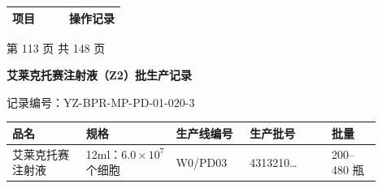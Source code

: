 \documentclass[UTF8,10pt,a4paper,fontset=fandol]{ctexart}
\newcommand{\fieldvalue}[1]{#1}
\newcommand{\handwritten}[1]{#1}
\begin{document}
\begin{tabular}{|p{0.5\linewidth}|p{0.5\linewidth}|}
\hline
项目 & 操作记录 \\
\hline
\end{tabular}

\begin{center}
第 113 页 共 148 页
\end{center}

\newpage

\begin{center}
\textbf{艾莱克托赛注射液（Z2）批生产记录}
\end{center}

\noindent
记录编号：YZ-BPR-MP-PD-01-020-3

\begin{center}
\begin{tabular}{|p{0.18\linewidth}|p{0.22\linewidth}|p{0.18\linewidth}|p{0.20\linewidth}|p{0.12\linewidth}|}
\hline
品名 & 规格 & 生产线编号 & 生产批号 & 批量\\
\hline
艾莱克托赛注射液 & 12ml：$6.0\times10^{7}$个细胞 &
\fieldvalue{\handwritten{W0/PD03}} &
\fieldvalue{\handwritten{4313210\ldots}} &
200--480 瓶\\
\hline
\end{tabular}
\end{center}
\end{document}
